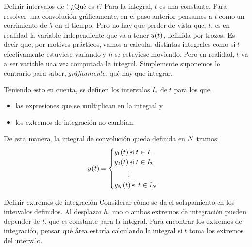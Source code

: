\begin{numset}
    \begin{numitem}{Definir intervalos de $t$}
        ¿Qué es $t$?
        Para la integral, $t$ es una constante.
        Para resolver una convolución gráficamente, en el paso anterior pensamos a $t$ como un corrimiento de $h$ en el tiempo.
        Pero no hay que perder de vista que, $t$, es en realidad la variable independiente que va a tener $\fx[y]{t}$, definida por trozos.
        Es decir que, por motivos prácticos, vamos a calcular distintas integrales como si $t$ efectivamente estuviese variando y $h$ se estuviese moviendo.
        Pero en realidad, $t$ va a ser variable una vez computada la integral.
        Simplemente suponemos lo contrario para saber, \emph{gráficamente}, qué hay que integrar.

        Teniendo esto en cuenta, se definen los intervalos $I_\ith$ de $t$ para los que
        \begin{itemize}
            \item las expresiones que se multiplican en la integral y
            \item los extremos de integración no cambian.
        \end{itemize}

        De esta manera, la integral de convolución queda definida en $\Nth$ tramos:
        \[
            \fx[y]{t} =
            \begin{cases}
                \fx[y_1]{t} \text{si } t \in I_1
                \\
                \fx[y_2]{t} \text{si } t \in I_2
                \\
                \hfil \vdots \hfil
                \\
                \fx[y_\Nth]{t} \text{si } t \in I_\Nth
            \end{cases}
        \]
    \end{numitem}

    \begin{numitem}{Definir extremos de integración}
        Considerar cómo se da el solapamiento en los intervalos definidos.
        Al desplazar $h$, uno o ambos extremos de integración pueden depender de $t$, que es constante para la integral.
        Para encontrar los extremos de integración, pensar qué área estaría calculando la integral si $t$ toma los extremos del intervalo.
    \end{numitem}
\end{numset}

